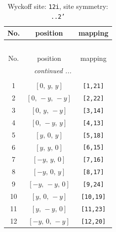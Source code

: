 \documentclass[fleqn,8pt]{jsarticle}
\begin{document}
\begin{longtable}{ccc}
\caption{Wyckoff site: {\tt 12i}, site symmetry: {\tt ..2'}}
 \\
 \hline \hline
No. & position & mapping \\ \hline \endfirsthead

\multicolumn{2}{l}{\tablename\ \thetable{}} \\
 \hline \hline
No. & position & mapping \\ \hline \endhead

 \hline \hline
\multicolumn{2}{r}{\footnotesize\it continued ...} \\ \endfoot

 \hline \hline
\multicolumn{2}{r}{} \\ \endlastfoot

1 & $\left[ 0,\, y,\, y \right]$ & {\tt [1,21]} \\ \hline
2 & $\left[ 0,\, - y,\, - y \right]$ & {\tt [2,22]} \\ \hline
3 & $\left[ 0,\, y,\, - y \right]$ & {\tt [3,14]} \\ \hline
4 & $\left[ 0,\, - y,\, y \right]$ & {\tt [4,13]} \\ \hline
5 & $\left[ y,\, 0,\, y \right]$ & {\tt [5,18]} \\ \hline
6 & $\left[ y,\, y,\, 0 \right]$ & {\tt [6,15]} \\ \hline
7 & $\left[ - y,\, y,\, 0 \right]$ & {\tt [7,16]} \\ \hline
8 & $\left[ - y,\, 0,\, y \right]$ & {\tt [8,17]} \\ \hline
9 & $\left[ - y,\, - y,\, 0 \right]$ & {\tt [9,24]} \\ \hline
10 & $\left[ y,\, 0,\, - y \right]$ & {\tt [10,19]} \\ \hline
11 & $\left[ y,\, - y,\, 0 \right]$ & {\tt [11,23]} \\ \hline
12 & $\left[ - y,\, 0,\, - y \right]$ & {\tt [12,20]} \\
\end{longtable}
\renewcommand{\arraystretch}{1.2}
\end{document}
